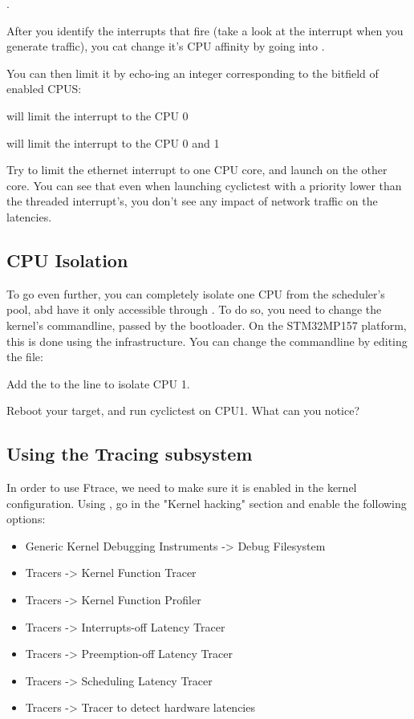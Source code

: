 .

After you identify the interrupts that fire (take a look at the  interrupt
when you generate traffic), you cat change it's CPU affinity by going into .

You can then limit it by echo-ing an integer corresponding to the bitfield of enabled CPUS:

 will limit the interrupt to the CPU 0

 will limit the interrupt to the CPU 0 and 1

Try to limit the ethernet interrupt to one CPU core, and launch  on the
other core. You can see that even when launching cyclictest with a priority lower than
the threaded interrupt's, you don't see any impact of network traffic on the latencies.

\subsection{CPU Isolation}

To go even further, you can completely isolate one CPU from the scheduler's pool,
abd have it only accessible through . To do so, you need to change
the kernel's commandline, passed by the bootloader. On the STM32MP157 platform,
this is done using the  infrastructure. You can change the
commandline by editing the  file:


Add the  to the  line to isolate CPU 1.

Reboot your target, and run cyclictest on CPU1. What can you notice?

\subsection{Using the Tracing subsystem}

In order to use Ftrace, we need to make sure it is enabled in the kernel
configuration. Using , go in the "Kernel hacking" section
and enable the following options:

\begin{itemize}
	\item Generic Kernel Debugging Instruments -> Debug Filesystem
	\item Tracers -> Kernel Function Tracer
	\item Tracers -> Kernel Function Profiler
	\item Tracers -> Interrupts-off Latency Tracer
	\item Tracers -> Preemption-off Latency Tracer
	\item Tracers -> Scheduling Latency Tracer
	\item Tracers -> Tracer to detect hardware latencies
\end{itemize}

